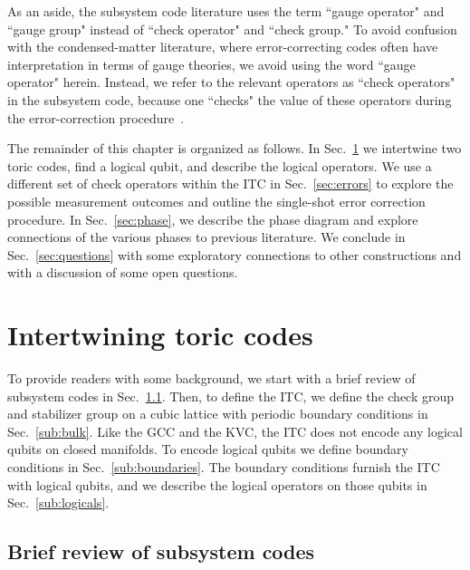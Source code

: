 As an aside, the subsystem code literature uses the term ``gauge operator" and ``gauge group" instead of ``check operator" and ``check group." To avoid confusion with the condensed-matter literature, where error-correcting codes often have interpretation in terms of gauge theories, we avoid using the word ``gauge operator" herein. Instead, we refer to the relevant operators as ``check operators" in the subsystem code, because one ``checks" the value of these operators during the error-correction procedure~\cite{HastingsHaah2021}.

The remainder of this chapter is organized as follows. In Sec.~\ref{sec:build} we intertwine two toric codes, find a logical qubit, and describe the logical operators. We use a different set of check operators within the ITC in Sec.~\ref{sec:errors} to explore the possible measurement outcomes and outline the single-shot error correction procedure. In Sec.~\ref{sec:phase}, we describe the phase diagram and explore connections of the various phases to previous literature. We conclude in Sec.~\ref{sec:questions} with some exploratory connections to other constructions and with a discussion of some open questions.

\section{Intertwining toric codes} \label{sec:build}

To provide readers with some background, we start with a brief review of subsystem codes in Sec.~\ref{sub:subsystem}. Then, to define the ITC, we define the check group and stabilizer group on a cubic lattice with periodic boundary conditions in Sec.~\ref{sub:bulk}. Like the GCC and the KVC, the ITC does not encode any logical qubits on closed manifolds. To encode logical qubits we define boundary conditions in Sec.~\ref{sub:boundaries}. The boundary conditions furnish the ITC with logical qubits, and we describe the logical operators on those qubits in Sec.~\ref{sub:logicals}.

\subsection{Brief review of subsystem codes} \label{sub:subsystem}

